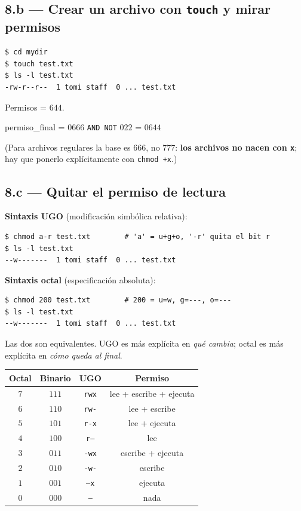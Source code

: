 \documentclass[11pt,a4paper]{article}
\begin{document}
\subsection*{8.b --- Crear un archivo con \texttt{touch} y mirar permisos}

\begin{lstlisting}[style=shellstyle]
$ cd mydir
$ touch test.txt
$ ls -l test.txt
-rw-r--r--  1 tomi staff  0 ... test.txt
\end{lstlisting}

Permisos = $644$.

\quad permiso\_final = $0666$ \texttt{AND NOT} $022$ = $0644$

(Para archivos regulares la base es $666$, no $777$: \textbf{los
archivos no nacen con \texttt{x}}; hay que ponerlo explícitamente con
\texttt{chmod +x}.)

\subsection*{8.c --- Quitar el permiso de lectura}

\textbf{Sintaxis UGO} (modificación simbólica relativa):

\begin{lstlisting}[style=shellstyle]
$ chmod a-r test.txt        # 'a' = u+g+o, '-r' quita el bit r
$ ls -l test.txt
--w-------  1 tomi staff  0 ... test.txt
\end{lstlisting}

\textbf{Sintaxis octal} (especificación absoluta):

\begin{lstlisting}[style=shellstyle]
$ chmod 200 test.txt        # 200 = u=w, g=---, o=---
$ ls -l test.txt
--w-------  1 tomi staff  0 ... test.txt
\end{lstlisting}

Las dos son equivalentes. UGO es más explícita en \emph{qué cambia};
octal es más explícita en \emph{cómo queda al final}.

\begin{center}
\small
\begin{tabular}{@{}cccc@{}}
\toprule
Octal & Binario & UGO & Permiso \\
\midrule
$7$ & $111$ & \texttt{rwx} & lee + escribe + ejecuta \\
$6$ & $110$ & \texttt{rw-} & lee + escribe \\
$5$ & $101$ & \texttt{r-x} & lee + ejecuta \\
$4$ & $100$ & \texttt{r--} & lee \\
$3$ & $011$ & \texttt{-wx} & escribe + ejecuta \\
$2$ & $010$ & \texttt{-w-} & escribe \\
$1$ & $001$ & \texttt{--x} & ejecuta \\
$0$ & $000$ & \texttt{---} & nada \\
\bottomrule
\end{tabular}
\end{center}
\end{document}
